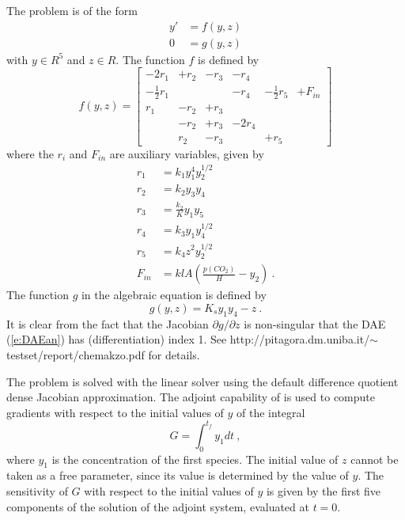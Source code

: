 The problem is of the form
\begin{equation}\label{e:DAEan}
\begin{split}
  y' &= f(y, z) \\
  0  &= g(y, z)
\end{split}
\end{equation}
with $y \in R^5$ and $z \in R$. The function $f$ is defined by
\begin{equation*}
  f(y, z) = \begin{bmatrix}
    -2r_1           &+r_2 &-r_3 &-r_4  &                &        \\
    -\frac{1}{2}r_1 &     &     &-r_4  &-\frac{1}{2}r_5 &+F_{in} \\
    r_1             &-r_2 &+r_3 &      &                &        \\
                    &-r_2 &+r_3 &-2r_4 &                &        \\
                    &r_2  &-r_3 &      &+r_5            &
  \end{bmatrix}
\end{equation*}
where the $r_i$ and $F_{in}$ are auxiliary variables, given by
\begin{equation*}
  \begin{split}
    r_1 & = k_1 y_1^4 y_2^{1/2} \\
    r_2 & = k_2 y_3 y_4 \\
    r_3 & = \frac{k_2}{K} y_1 y_5 \\
    r_4 & = k_3 y_1 y_4^{1/2} \\
    r_5 & = k_4 z^2 y_2^{1/2} \\
    F_{in} & = klA \left( \frac{p(CO_2)}{H} - y_2 \right) ~.
  \end{split}
\end{equation*}
The function $g$ in the algebraic equation is defined by
\begin{equation*}
  g(y, z) = K_s y_1 y_4 - z ~.
\end{equation*}
It is clear from the fact that the Jacobian $\partial g / \partial z$ is non-singular
that the DAE (\ref{e:DAEan}) has (differentiation) index 1.
See http://pitagora.dm.uniba.it/$\sim$testset/report/chemakzo.pdf for details.


The problem is solved with the {\sunlinsoldense} linear solver using the
default difference quotient dense Jacobian approximation.
The adjoint capability of {\idas} is used to compute gradients with
respect to the initial values of $y$ of the integral
\begin{equation*}
  G = \int_0^{t_f} y_1 dt ~,
\end{equation*}
where $y_1$ is the concentration of the first species. The initial value of $z$
cannot be taken as a free parameter, since its value is determined by the value
of $y$. The sensitivity of $G$ with respect to the initial values of $y$ is
given by the first five components of the solution of the adjoint system,
evaluated at $t = 0$.

